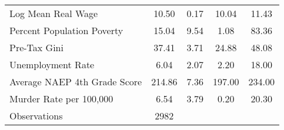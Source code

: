 \begin{tabular}{l*{1}{cccc}}
Log Mean Real Wage  &       10.50&        0.17&       10.04&       11.43\\
Percent Population Poverty&       15.04&        9.54&        1.08&       83.36\\
Pre-Tax Gini        &       37.41&        3.71&       24.88&       48.08\\
Unemployment Rate   &        6.04&        2.07&        2.20&       18.00\\
Average NAEP 4th Grade Score&      214.86&        7.36&      197.00&      234.00\\
Murder Rate per 100,000&        6.54&        3.79&        0.20&       20.30\\
\midrule
Observations        &        2982&            &            &            \\
\bottomrule
\end{tabular}
